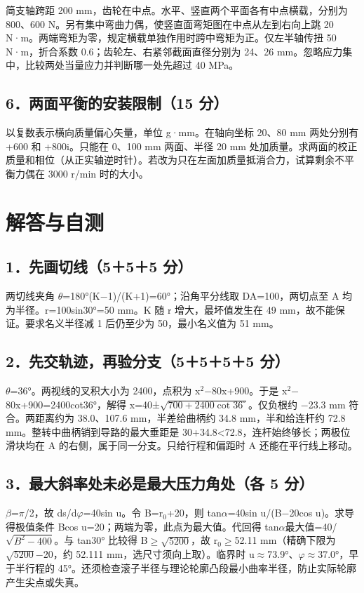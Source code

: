 \documentclass[zihao=5,a4paper,UTF8,fontset=fandol]{ctexart}
\begin{document}
简支轴跨距 200 mm，齿轮在中点。水平、竖直两个平面各有中点横载，分别为 800、600 N。另有集中弯曲力偶，使竖直面弯矩图在中点从左到右向上跳 20 N·m。两端弯矩为零，规定横载单独作用时跨中弯矩为正。仅左半轴传扭 50 N·m，折合系数 0.6；齿轮左、右紧邻截面直径分别为 24、26 mm。忽略应力集中，比较两处当量应力并判断哪一处先超过 40 MPa。


\subsection{6．两面平衡的安装限制（15 分）}

以复数表示横向质量偏心矢量，单位 g·mm。在轴向坐标 20、80 mm 两处分别有 +600 和 +800i。只能在 0、100 mm 两面、半径 20 mm 处加质量。求两面的校正质量和相位（从正实轴逆时针）。若改为只在左面加质量抵消合力，试算剩余不平衡力偶在 3000 r/min 时的大小。


\clearpage\section{解答与自测}

\subsection{1．先画切线（5＋5＋5 分）}

两切线夹角 $\theta$=180°(K$-$1)/(K+1)=60°；沿角平分线取 DA=100，两切点至 A 均为半径。r=100sin30°=50 mm。K 随 r 增大，最坏值发生在 49 mm，故不能保证。要求名义半径减 1 后仍至少为 50，最小名义值为 51 mm。


\subsection{2．先交轨迹，再验分支（5＋5＋5＋5 分）}

$\theta$=36°。两视线的叉积大小为 2400，点积为 x$^{2}$$-$80x+900。于是 x$^{2}$$-$80x+900=2400cot36°，解得 x=40±$\sqrt{700+2400\cot 36^{\circ}}$。仅负根约 $-$23.3 mm 符合。两距离约为 38.0、107.6 mm，半差给曲柄约 34.8 mm，半和给连杆约 72.8 mm。整转中曲柄销到导路的最大垂距是 30+34.8<72.8，连杆始终够长；两极位滑块均在 A 的右侧，属于同一分支。只给行程和偏距时 A 还能在平行线上移动。


\subsection{3．最大斜率处未必是最大压力角处（各 5 分）}

$\beta$=$\pi$/2，故 ds/d$\varphi$=40sin u。令 B=r$_{0}$+20，则 tan$\alpha$=40sin u/(B$-$20cos u)。求导得极值条件 Bcos u=20；两端为零，此点为最大值。代回得 tan$\alpha$最大值=40/$\sqrt{B^{2}-400}$。与 tan30° 比较得 B$\ge$$\sqrt{5200}$，故 r$_{0}$$\ge$52.11 mm（精确下限为 $\sqrt{5200}$$-$20，约 52.111 mm，选尺寸须向上取）。临界时 u$\approx$73.9°、$\varphi$$\approx$37.0°，早于半行程的 45°。还须检查滚子半径与理论轮廓凸段最小曲率半径，防止实际轮廓产生尖点或失真。
\end{document}
